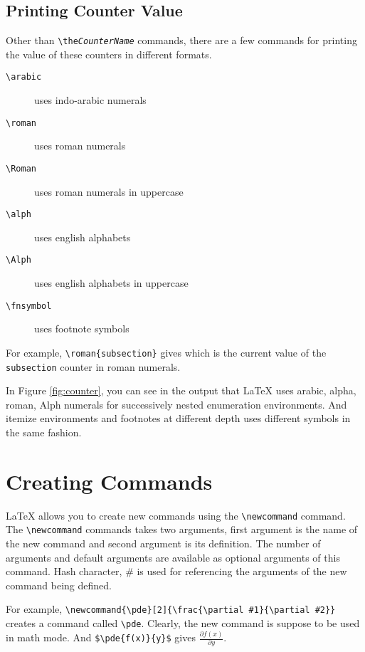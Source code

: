 \documentclass{article}
\theoremstyle{definition}
\theoremstyle{remark}
\begin{document}
\subsection{Printing Counter Value}
	Other than \texttt{\textbackslash the\textit{CounterName}} commands, there are a few commands for printing the value of these counters in different formats.
\begin{description}
	\item[\texttt{\textbackslash arabic}] uses indo-arabic numerals
	\item[\texttt{\textbackslash roman}] uses roman numerals
	\item[\texttt{\textbackslash Roman}] uses roman numerals in uppercase
	\item[\texttt{\textbackslash alph}] uses english alphabets
	\item[\texttt{\textbackslash Alph}] uses english alphabets in uppercase
	\item[\texttt{\textbackslash fnsymbol}] uses footnote symbols
\end{description}

	For example, \texttt{\textbackslash roman\{subsection\}} gives  which is the current value of the \texttt{subsection} counter in roman numerals.

	In Figure \ref{fig:counter}, you can see in the output that \LaTeX{} uses arabic, alpha, roman, Alph numerals for successively nested enumeration environments. And itemize environments and footnotes at different depth uses different symbols in the same fashion.

\section{Creating Commands}
	\LaTeX{} allows you to create new commands using the \texttt{\textbackslash newcommand} command. The \texttt{\textbackslash newcommand} commands takes two arguments, first argument is the name of the new command and second argument is its definition. The number of arguments and default arguments are available as optional arguments of this command. Hash character, \# is used for referencing the arguments of the new command being defined.

	For example, \texttt{\textbackslash newcommand\{\textbackslash pde\}[2]\{\textbackslash frac\{\textbackslash partial \#1\}\{\textbackslash partial \#2\}\}} creates a command called \texttt{\textbackslash pde}. Clearly, the new command is suppose to be used in math mode. And \texttt{\$\textbackslash pde\{f(x)\}\{y\}\$} gives $\frac{\partial f(x)}{\partial y}$.
\end{document}
